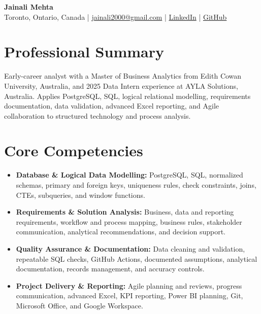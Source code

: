 \documentclass[letterpaper,10pt]{article}
\begin{document}
\begin{center}
  {\fontsize{17}{19}\selectfont\textbf{Jainali Mehta}}\\[2pt]
  \small Toronto, Ontario, Canada \;|\;
  \href{mailto:jainali2000@gmail.com}{jainali2000@gmail.com} \;|\;
  \href{https://www.linkedin.com/in/jainali-mehta}{LinkedIn} \;|\;
  \href{https://github.com/jainalimehta}{GitHub}
\end{center}
\vspace{-7pt}

\section{Professional Summary}
\small Early-career analyst with a Master of Business Analytics from Edith Cowan University, Australia, and 2025 Data Intern experience at AYLA Solutions, Australia. Applies PostgreSQL, SQL, logical relational modelling, requirements documentation, data validation, advanced Excel reporting, and Agile collaboration to structured technology and process analysis.

\section{Core Competencies}
\begin{itemize}[leftmargin=0.16in,label=\textbullet,topsep=0pt,itemsep=1pt,parsep=0pt]
  \item \small \textbf{Database \& Logical Data Modelling:} PostgreSQL, SQL, normalized schemas, primary and foreign keys, uniqueness rules, check constraints, joins, CTEs, subqueries, and window functions.
  \item \small \textbf{Requirements \& Solution Analysis:} Business, data and reporting requirements, workflow and process mapping, business rules, stakeholder communication, analytical recommendations, and decision support.
  \item \small \textbf{Quality Assurance \& Documentation:} Data cleaning and validation, repeatable SQL checks, GitHub Actions, documented assumptions, analytical documentation, records management, and accuracy controls.
  \item \small \textbf{Project Delivery \& Reporting:} Agile planning and reviews, progress communication, advanced Excel, KPI reporting, Power BI planning, Git, Microsoft Office, and Google Workspace.
\end{itemize}
\end{document}
